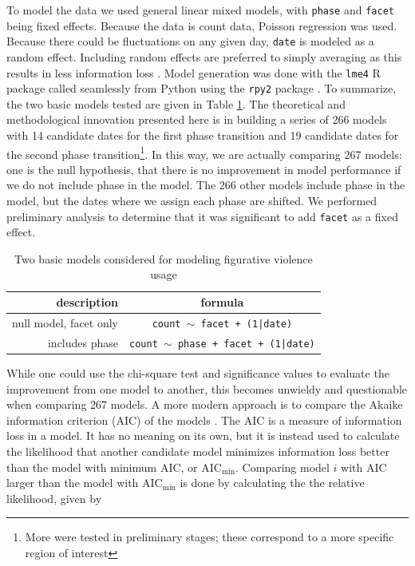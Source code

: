 To model the data we used general linear mixed models, 
with \texttt{phase} and \texttt{facet} 
being fixed effects. Because the data is count data, Poisson regression was
used. Because there could be fluctuations on any given day,
\texttt{date} is modeled as a random effect. Including random effects are
preferred to simply averaging as this results in less information loss
\cite{Winter2013, Burnham2011, Clark1973}. Model generation was done with
the \texttt{lme4} R package \cite{Bates2015} called seamlessly 
from Python using the \texttt{rpy2} package \cite{Gautier2017}. To summarize,
the two basic models tested are given in Table \ref{tab:models}. The 
theoretical and methodological innovation presented here is in building 
a series of 266 models with 14 candidate dates for the first phase transition
and 19 candidate dates for the second phase transition\footnote{More were
tested in preliminary stages; these correspond to a more specific region of
interest}. In this way, we are actually comparing 267 models: one is the null
hypothesis, that there is no improvement in model performance if we do not
include phase in the model. The 266 other models include phase in the model,
but the dates where we assign each phase are shifted. We performed preliminary
analysis to determine that it was significant to add \texttt{facet} as a 
fixed effect.

\begin{table}[ht]
    \centering
    \begin{tabular}{|r|c|}
        \hline
        description & formula \\
        \hline
        null model, facet only & \texttt{count $\sim$ facet + (1|date)} \\
        includes phase       & \texttt{count $\sim$ phase + facet + (1|date)} \\
        \hline
    \end{tabular}
    \caption{Two basic models considered for modeling figurative violence usage}
    \label{tab:models}
\end{table}

While one could use the chi-square test and significance values to evaluate
the improvement from one model to another, this becomes unwieldy and 
questionable when comparing 267 models. A more modern approach is to compare
the Akaike information criterion (AIC) of the models 
\cite{Akaike1974, Burnham2004, Burnham2011}. The AIC is a measure of 
information loss in a model. It has no meaning on its own, but it is instead
used to calculate the likelihood that another candidate model minimizes 
information loss better than the model with minimum AIC, or 
AIC$_{\mathrm{min}}$. Comparing model $i$ with AIC larger than 
the model with AIC$_{\mathrm{min}}$ is done by calculating the 
the relative likelihood, given by

